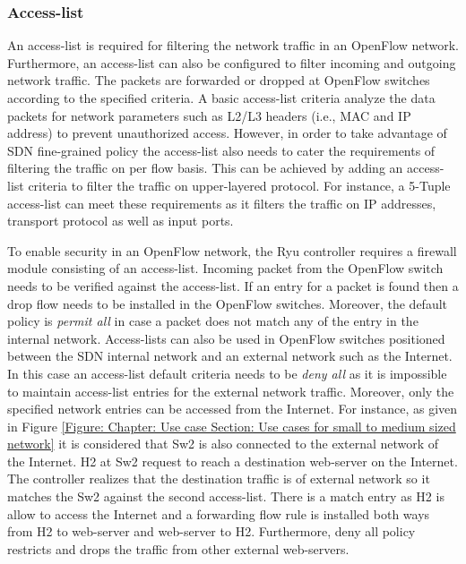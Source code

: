 \subsubsection{Access-list}

An access-list is required for filtering the network traffic in an OpenFlow network. Furthermore, an access-list can also be configured to filter incoming and outgoing network traffic. The packets are forwarded or dropped at OpenFlow switches according to the specified criteria. A basic access-list criteria analyze the data packets for network parameters such as L2/L3 headers (i.e., MAC and IP address) to prevent unauthorized access.
However, in order to take advantage of SDN fine-grained policy the access-list also needs to cater the requirements of filtering the traffic  on per flow basis. This can be achieved by adding an access-list criteria to filter the traffic on upper-layered protocol. For instance, a 5-Tuple access-list can meet these requirements as it filters the traffic on IP addresses, transport protocol as well as input ports. 
 
To enable security in an OpenFlow network, the Ryu controller requires a firewall module consisting of an access-list. Incoming packet from the OpenFlow switch needs to be verified against the access-list. If an entry for a packet is found then a drop flow needs to be installed in the OpenFlow switches. Moreover, the default policy is \textit{permit all} in case a packet does not match any of the entry in the internal network. Access-lists can also be used in OpenFlow switches positioned between the SDN internal network and an external network such as the Internet. In this case an access-list default criteria needs to be \textit{deny all} as it is impossible to maintain access-list entries for the external network traffic. Moreover, only the specified network entries can be accessed from the Internet. For instance, as given in Figure \ref{Figure: Chapter: Use case Section: Use cases for small to medium sized network} it is considered that Sw2 is also connected to the external network of the Internet. H2 at Sw2 request to reach a destination web-server on the Internet. The controller realizes that the destination traffic is of external network so it matches the Sw2 against the second access-list. There is a match entry as H2 is allow to access the Internet and a forwarding flow rule is installed both ways from H2 to web-server and web-server to H2. Furthermore, deny all policy restricts and drops the traffic from other external web-servers. 

